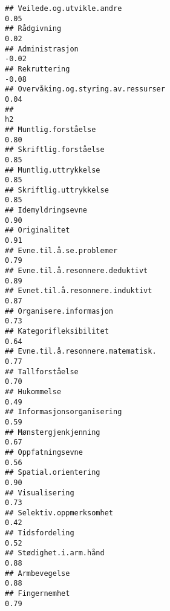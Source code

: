 \documentclass[
]{article}
\begin{document}
\begin{verbatim}
## Veilede.og.utvikle.andre                                                          0.05
## Rådgivning                                                                        0.02
## Administrasjon                                                                   -0.02
## Rekruttering                                                                     -0.08
## Overvåking.og.styring.av.ressurser                                                0.04
##                                                                                    h2
## Muntlig.forståelse                                                               0.80
## Skriftlig.forståelse                                                             0.85
## Muntlig.uttrykkelse                                                              0.85
## Skriftlig.uttrykkelse                                                            0.85
## Idemyldringsevne                                                                 0.90
## Originalitet                                                                     0.91
## Evne.til.å.se.problemer                                                          0.79
## Evne.til.å.resonnere.deduktivt                                                   0.89
## Evnet.til.å.resonnere.induktivt                                                  0.87
## Organisere.informasjon                                                           0.73
## Kategorifleksibilitet                                                            0.64
## Evne.til.å.resonnere.matematisk.                                                 0.77
## Tallforståelse                                                                   0.70
## Hukommelse                                                                       0.49
## Informasjonsorganisering                                                         0.59
## Mønstergjenkjenning                                                              0.67
## Oppfatningsevne                                                                  0.56
## Spatial.orientering                                                              0.90
## Visualisering                                                                    0.73
## Selektiv.oppmerksomhet                                                           0.42
## Tidsfordeling                                                                    0.52
## Stødighet.i.arm.hånd                                                             0.88
## Armbevegelse                                                                     0.88
## Fingernemhet                                                                     0.79

\end{verbatim}
\end{document}
